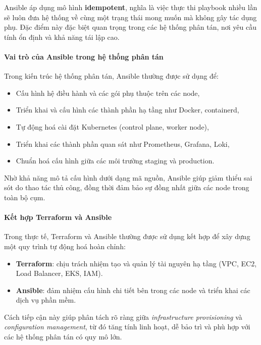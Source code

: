Ansible áp dụng mô hình \textbf{idempotent}, nghĩa là việc thực thi playbook nhiều lần 
sẽ luôn đưa hệ thống về cùng một trạng thái mong muốn mà không gây tác dụng phụ. 
Đặc điểm này đặc biệt quan trọng trong các hệ thống phân tán, nơi yêu cầu tính ổn định 
và khả năng tái lập cao.

\paragraph*{Vai trò của Ansible trong hệ thống phân tán}

Trong kiến trúc hệ thống phân tán, Ansible thường được sử dụng để:

\begin{itemize}
    \item Cấu hình hệ điều hành và các gói phụ thuộc trên các node,
    \item Triển khai và cấu hình các thành phần hạ tầng như Docker, containerd,
    \item Tự động hoá cài đặt Kubernetes (control plane, worker node),
    \item Triển khai các thành phần quan sát như Prometheus, Grafana, Loki,
    \item Chuẩn hoá cấu hình giữa các môi trường staging và production.
\end{itemize}

Nhờ khả năng mô tả cấu hình dưới dạng mã nguồn, Ansible giúp giảm thiểu sai sót 
do thao tác thủ công, đồng thời đảm bảo sự đồng nhất giữa các node trong toàn bộ cụm.

\paragraph*{Kết hợp Terraform và Ansible}

Trong thực tế, Terraform và Ansible thường được sử dụng kết hợp để xây dựng 
một quy trình tự động hoá hoàn chỉnh:

\begin{itemize}
    \item \textbf{Terraform}: chịu trách nhiệm tạo và quản lý tài nguyên hạ tầng 
    (VPC, EC2, Load Balancer, EKS, IAM).
    \item \textbf{Ansible}: đảm nhiệm cấu hình chi tiết bên trong các node và 
    triển khai các dịch vụ phần mềm.
\end{itemize}

Cách tiếp cận này giúp phân tách rõ ràng giữa \textit{infrastructure provisioning} 
và \textit{configuration management}, từ đó tăng tính linh hoạt, dễ bảo trì 
và phù hợp với các hệ thống phân tán có quy mô lớn.

